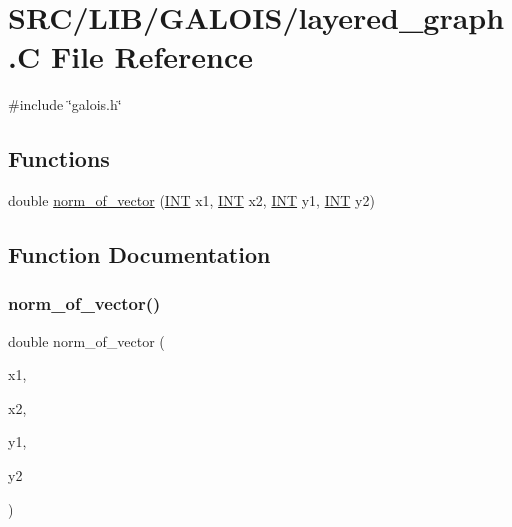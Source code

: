 \hypertarget{layered__graph_8_c}{}\section{S\+R\+C/\+L\+I\+B/\+G\+A\+L\+O\+I\+S/layered\+\_\+graph.C File Reference}
\label{layered__graph_8_c}
{\ttfamily \#include \char`\"{}galois.\+h\char`\"{}}\newline
\subsection*{Functions}
\begin{DoxyCompactItemize}
\item 
double \mbox{\hyperlink{layered__graph_8_c_a4778f1c458356058461e7eff396897ce}{norm\+\_\+of\+\_\+vector}} (\mbox{\hyperlink{galois_8h_a09fddde158a3a20bd2dcadb609de11dc}{I\+NT}} x1, \mbox{\hyperlink{galois_8h_a09fddde158a3a20bd2dcadb609de11dc}{I\+NT}} x2, \mbox{\hyperlink{galois_8h_a09fddde158a3a20bd2dcadb609de11dc}{I\+NT}} y1, \mbox{\hyperlink{galois_8h_a09fddde158a3a20bd2dcadb609de11dc}{I\+NT}} y2)
\end{DoxyCompactItemize}


\subsection{Function Documentation}
\mbox{\label{layered__graph_8_c_a4778f1c458356058461e7eff396897ce}} 
\subsubsection{\texorpdfstring{norm\+\_\+of\+\_\+vector()}{norm\_of\_vector()}}
{\footnotesize\ttfamily double norm\+\_\+of\+\_\+vector (\begin{DoxyParamCaption}\item[{\mbox{\hyperlink{galois_8h_a09fddde158a3a20bd2dcadb609de11dc}{I\+NT}}}]{x1,  }\item[{\mbox{\hyperlink{galois_8h_a09fddde158a3a20bd2dcadb609de11dc}{I\+NT}}}]{x2,  }\item[{\mbox{\hyperlink{galois_8h_a09fddde158a3a20bd2dcadb609de11dc}{I\+NT}}}]{y1,  }\item[{\mbox{\hyperlink{galois_8h_a09fddde158a3a20bd2dcadb609de11dc}{I\+NT}}}]{y2 }\end{DoxyParamCaption})}

